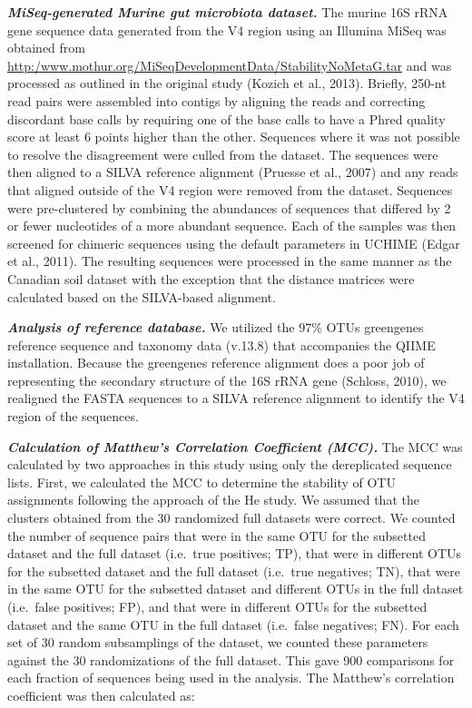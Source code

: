 \documentclass[11pt,]{article}
\begin{document}
\textbf{\emph{MiSeq-generated Murine gut microbiota dataset.}} The
murine 16S rRNA gene sequence data generated from the V4 region using an
Illumina MiSeq was obtained from
\url{http:/www.mothur.org/MiSeqDevelopmentData/StabilityNoMetaG.tar} and
was processed as outlined in the original study (Kozich et al., 2013).
Briefly, 250-nt read pairs were assembled into contigs by aligning the
reads and correcting discordant base calls by requiring one of the base
calls to have a Phred quality score at least 6 points higher than the
other. Sequences where it was not possible to resolve the disagreement
were culled from the dataset. The sequences were then aligned to a SILVA
reference alignment (Pruesse et al., 2007) and any reads that aligned
outside of the V4 region were removed from the dataset. Sequences were
pre-clustered by combining the abundances of sequences that differed by
2 or fewer nucleotides of a more abundant sequence. Each of the samples
was then screened for chimeric sequences using the default parameters in
UCHIME (Edgar et al., 2011). The resulting sequences were processed in
the same manner as the Canadian soil dataset with the exception that the
distance matrices were calculated based on the SILVA-based alignment.

\textbf{\emph{Analysis of reference database.}} We utilized the 97\%
OTUs greengenes reference sequence and taxonomy data (v.13.8) that
accompanies the QIIME installation. Because the greengenes reference
alignment does a poor job of representing the secondary structure of the
16S rRNA gene (Schloss, 2010), we realigned the FASTA sequences to a
SILVA reference alignment to identify the V4 region of the sequences.

\textbf{\emph{Calculation of Matthew's Correlation Coefficient (MCC).}}
The MCC was calculated by two approaches in this study using only the
dereplicated sequence lists. First, we calculated the MCC to determine
the stability of OTU assignments following the approach of the He study.
We assumed that the clusters obtained from the 30 randomized full
datasets were correct. We counted the number of sequence pairs that were
in the same OTU for the subsetted dataset and the full dataset
(i.e.~true positives; TP), that were in different OTUs for the subsetted
dataset and the full dataset (i.e.~true negatives; TN), that were in the
same OTU for the subsetted dataset and different OTUs in the full
dataset (i.e.~false positives; FP), and that were in different OTUs for
the subsetted dataset and the same OTU in the full dataset (i.e.~false
negatives; FN). For each set of 30 random subsamplings of the dataset,
we counted these parameters against the 30 randomizations of the full
dataset. This gave 900 comparisons for each fraction of sequences being
used in the analysis. The Matthew's correlation coefficient was then
calculated as:
\end{document}
